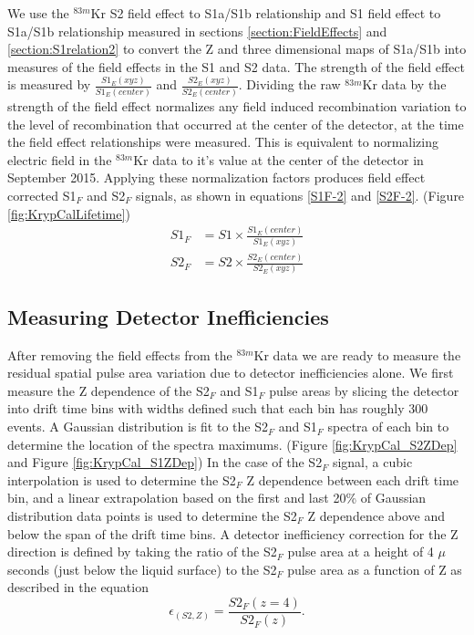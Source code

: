 We use the $^{83m}$Kr S2 field effect to S1a/S1b relationship and S1 field effect to S1a/S1b relationship measured in sections \ref{section:FieldEffects} and \ref{section:S1relation2} to convert the Z and three dimensional maps of S1a/S1b into measures of the field effects in the S1 and S2 data.  The strength of the field effect is measured by $\frac{S1_E(xyz)}{S1_E(center)}$ and $\frac{S2_E(xyz)}{S2_E(center)}$.  Dividing the raw $^{83m}$Kr data by the strength of the field effect normalizes any field induced recombination variation to the level of recombination that occurred at the center of the detector, at the time the field effect relationships were measured.  This is equivalent to normalizing electric field in the $^{83m}$Kr data to it's value at the center of the detector in September 2015. Applying these normalization factors produces field effect corrected S1$_F$ and S2$_F$ signals, as shown in equations \ref{S1F-2} and \ref{S2F-2}. (Figure \ref{fig:KrypCalLifetime})
\begin{align} 
S1_F &=S1 \times \frac{S1_E(center)}{S1_E(xyz)} \label{S1F-2} \\
S2_F &=S2 \times \frac{S2_E(center)}{S2_E(xyz)} \label{S2F-2}
\end{align}

\subsection{Measuring Detector Inefficiencies}

After removing the field effects from the $^{83m}$Kr data we are ready to measure the residual spatial pulse area variation due to detector inefficiencies alone.  We first measure the Z dependence of the S2$_F$ and S1$_F$ pulse areas by slicing the detector into drift time bins with widths defined such that each bin has roughly 300 events.  A Gaussian distribution is fit to the S2$_F$ and S1$_F$ spectra of each bin to determine the location of the spectra maximums. (Figure \ref{fig:KrypCal_S2ZDep} and Figure \ref{fig:KrypCal_S1ZDep}) In the case of the S2$_F$ signal, a cubic interpolation is used to determine the S2$_F$ Z dependence between each drift time bin, and a linear extrapolation based on the first and last 20\% of Gaussian distribution data points is used to determine the S2$_F$ Z dependence above and below the span of the drift time bins.  A detector inefficiency correction for the Z direction is defined by taking the ratio of the S2$_F$  pulse area at a height of 4 $\mu$seconds (just below the liquid surface) to the S2$_F$ pulse area as a function of Z as described in the equation
\begin{equation}
\epsilon_{(S2,Z)} = \frac{S2_F(z=4)}{S2_F(z)}.
\end{equation} 


